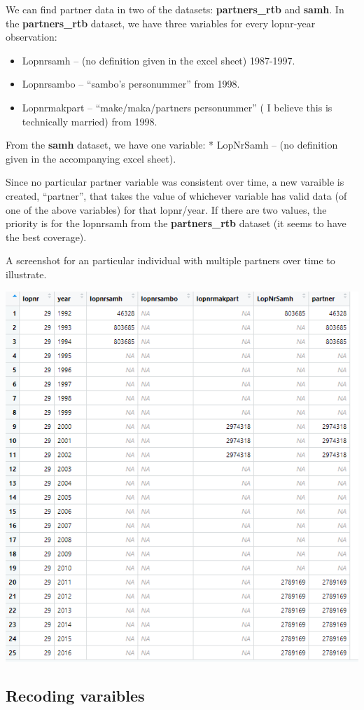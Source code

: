\documentclass[
]{book}
\providecommand{\tightlist}{%
  \setlength{\itemsep}{0pt}\setlength{\parskip}{0pt}}
\begin{document}
We can find partner data in two of the datasets: \textbf{partners\_rtb} and \textbf{samh}. In the \textbf{partners\_rtb} dataset, we have three variables for every lopnr-year observation:

\begin{itemize}
\tightlist
\item
  Lopnrsamh -- (no definition given in the excel sheet) 1987-1997.
\item
  Lopnrsambo -- ``sambo's personummer'' from 1998.
\item
  Lopnrmakpart -- ``make/maka/partners personummer'' ( I believe this is technically married) from 1998.
\end{itemize}

From the \textbf{samh} dataset, we have one variable:
* LopNrSamh -- (no definition given in the accompanying excel sheet).

Since no particular partner variable was consistent over time, a new varaible is created, ``partner'', that takes the value of whichever variable has valid data (of one of the above variables) for that lopnr/year. If there are two values, the priority is for the lopnrsamh from the \textbf{partners\_rtb} dataset (it seems to have the best coverage).

A screenshot for an particular individual with multiple partners over time to illustrate.

\includegraphics[width=0.8\linewidth]{output/figures/partners_png}

\hypertarget{recoding-varaibles}{%
\subsection{Recoding varaibles}\label{recoding-varaibles}}
\end{document}
